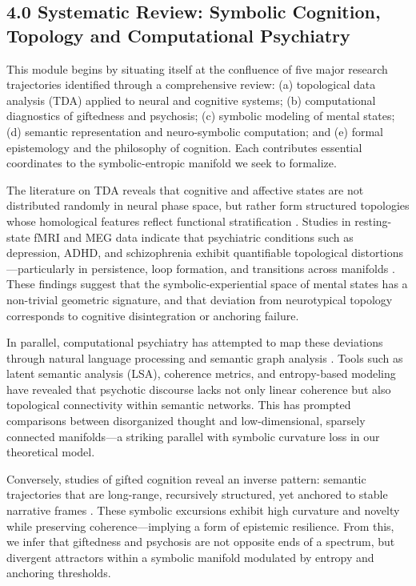 \subsection*{4.0 Systematic Review: Symbolic Cognition, Topology and Computational Psychiatry}

This module begins by situating itself at the confluence of five major research trajectories identified through a comprehensive review: (a) topological data analysis (TDA) applied to neural and cognitive systems; (b) computational diagnostics of giftedness and psychosis; (c) symbolic modeling of mental states; (d) semantic representation and neuro-symbolic computation; and (e) formal epistemology and the philosophy of cognition. Each contributes essential coordinates to the symbolic-entropic manifold we seek to formalize.

The literature on TDA reveals that cognitive and affective states are not distributed randomly in neural phase space, but rather form structured topologies whose homological features reflect functional stratification \cite{carlsson2009topology, giusti2016two}. Studies in resting-state fMRI and MEG data indicate that psychiatric conditions such as depression, ADHD, and schizophrenia exhibit quantifiable topological distortions—particularly in persistence, loop formation, and transitions across manifolds \cite{saggar2018towards, kyeong2017adhd}. These findings suggest that the symbolic-experiential space of mental states has a non-trivial geometric signature, and that deviation from neurotypical topology corresponds to cognitive disintegration or anchoring failure.

In parallel, computational psychiatry has attempted to map these deviations through natural language processing and semantic graph analysis \cite{elvevag2007lsa, bzdok2018toward}. Tools such as latent semantic analysis (LSA), coherence metrics, and entropy-based modeling have revealed that psychotic discourse lacks not only linear coherence but also topological connectivity within semantic networks. This has prompted comparisons between disorganized thought and low-dimensional, sparsely connected manifolds—a striking parallel with symbolic curvature loss in our theoretical model.

Conversely, studies of gifted cognition reveal an inverse pattern: semantic trajectories that are long-range, recursively structured, yet anchored to stable narrative frames \cite{silverman2009giftedness, wang2018computational}. These symbolic excursions exhibit high curvature and novelty while preserving coherence—implying a form of epistemic resilience. From this, we infer that giftedness and psychosis are not opposite ends of a spectrum, but divergent attractors within a symbolic manifold modulated by entropy and anchoring thresholds.

